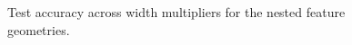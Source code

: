 \begin{figure}[!t]
\centering
{}
\caption{Test accuracy across width multipliers for the nested feature geometries.}
\label{fig:feature-capacity-effects}
\end{figure}
